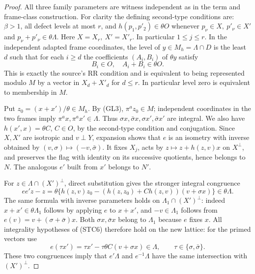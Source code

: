 \begin{proof}
All three family parameters are witness independent
as in the term and frame-class construction.
For clarity the defining second-type conditions are:
\(\beta>1\), all defect levels at most \(r\), and
\(h(p_1,p'_2)\in\theta O\) whenever
\(p_\nu\in X,\ p'_\nu\in X'\) and
\(p_\nu+p'_\nu\in\theta\Lambda\).
Here \(X=X_r,\ X'=X'_r\). In particular \(1\le j\le r\).
In the independent adapted frame coordinates,
the level of \(y\in M_h=\Lambda\cap D\) is the
least \(d\) such that for each \(i\ge d\) the
coefficients \((A_i,B_i)\) of \(\theta y\) satisfy
\[
 B_i\in O,\quad A_i+B_i\in\theta O.
 \tag{STC5}
\]
This is exactly the source's RR condition and
is equivalent to being represented modulo \(M\)
by a vector in \(X_d+X'_d\) for \(d\le r\).
In particular level zero is equivalent to membership
in \(M\).

Put \(z_0=(x+x')/\theta\in M_h\).
By (GL3), \(\pi^a z_0\in M\); independent
coordinates in the two frames imply
\(\pi^a x,\pi^a x'\in\Lambda\).
Thus \(\sigma x,\bar\sigma x,\sigma x',\bar\sigma x'\)
are integral. We also have
\(h(x',x)=\theta C\), \(C\in O\), by the second-type
condition and conjugation. Since \(X,X'\) are
isotropic and \(v\perp Y\), expansion shows that
\(e\) is an isometry with inverse obtained by
\((v,\sigma)\mapsto(-v,\bar\sigma)\).
It fixes \(X_j\), acts by \(z\mapsto z+h(z,v)x\)
on \(X^\perp\), and preserves the flag with identity
on its successive quotients, hence belongs to \(N\).
The analogous \(e'\) built from \(x'\) belongs to \(N'\).

For \(z\in\Lambda\cap (X')^\perp\), direct substitution
gives the stronger integral congruence
\[
 ee'z-z=\theta\{h(z,v)z_0-
          (h(z,z_0)+C h(z,v))(v+\sigma x)\}
          \in\theta\Lambda .                       \tag{STC6}
\]
The same formula with inverse parameters holds on
\(\Lambda_1\cap(X')^\perp\): indeed \(x+x'\in
\theta\Lambda_1\) follows by applying \(e\) to
\(x+x'\), and \(-v\in\Lambda_1\) follows from
\(e(v)=v+(\sigma+\bar\sigma)x\).
Both \(\sigma x,\bar\sigma x\) belong to \(\Lambda_1\)
because \(e\) fixes \(x\). All integrality hypotheses
of (STC6) therefore hold on the new lattice: for the
primed vectors use
\[
 e(\tau x')=\tau x'-\tau\theta C(v+\sigma x)\in\Lambda,
 \qquad \tau\in\{\sigma,\bar\sigma\}.
\]
These two congruences imply that \(e'\Lambda\)
and \(e^{-1}\Lambda\) have the same intersection
with \((X')^\perp\).


\end{proof}
